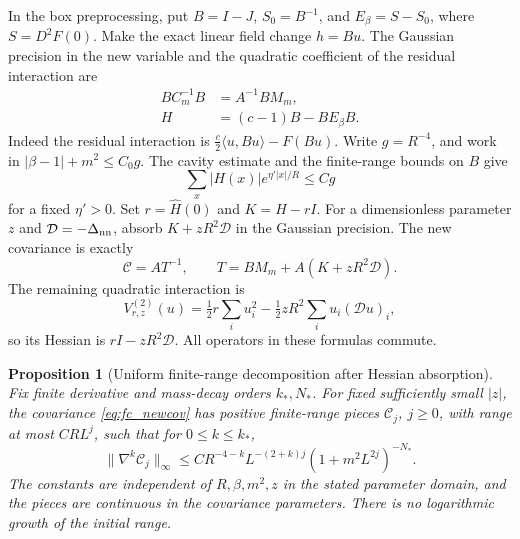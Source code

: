 \documentclass[11pt]{article}
\newtheorem{proposition}{Proposition}[section]
\begin{document}
In the box preprocessing, put \(B=I-J\), \(S_0=B^{-1}\), and
\(E_\beta=S-S_0\), where \(S=D^2F(0)\). Make the exact linear field
change \(h=Bu\). The Gaussian precision in the new variable and the
quadratic coefficient of the residual interaction are
\begin{align*}
 B C_m^{-1} B&=A^{-1}B M_m,\\
 H&=(c-1)B-BE_\beta B .
\end{align*}
Indeed the residual interaction is
\(\frac c2\langle u,Bu\rangle-F(Bu)\). Write \(g=R^{-4}\), and
work in \(|\beta-1|+m^2\le C_0g\). The cavity estimate and the
finite-range bounds on \(B\) give
\begin{equation}\label{eq:fc_Hnorm}
 \sum_x |H(x)|e^{\eta'|x|/R}\le Cg
\end{equation}
for a fixed \(\eta'>0\). Set \(r=\widehat H(0)\) and \(K=H-rI\).
For a dimensionless parameter \(z\) and \(\mathcal D=-\Delta_{\rm nn}\),
absorb \(K+zR^2\mathcal D\) in the Gaussian precision. The new covariance
is exactly
\begin{equation}\label{eq:fc_newcov}
 \mathscr C=A T^{-1},\qquad
 T=BM_m+A(K+zR^2\mathcal D).
\end{equation}
The remaining quadratic interaction is
\[
 V^{(2)}_{r,z}(u)=\tfrac12r\sum_i u_i^2
       -\tfrac12zR^2\sum_i u_i(\mathcal D u)_i,
\]
so its Hessian is \(rI-zR^2\mathcal D\). All operators in these formulas commute.

\begin{proposition}[Uniform finite-range decomposition after Hessian absorption]\label{prop:fc_newcovbound}
Fix finite derivative and mass-decay orders \(k_*,N_*\). For fixed
sufficiently small \(|z|\), the covariance \eqref{eq:fc_newcov} has
positive finite-range pieces \(\mathscr C_j\), \(j\ge0\), with range
at most \(C R L^j\), such that for \(0\le k\le k_*\),
\[
 \|\nabla^k\mathscr C_j\|_\infty
 \le C R^{-4-k}L^{-(2+k)j}(1+m^2L^{2j})^{-N_*}.
\]
The constants are independent of \(R,\beta,m^2,z\) in the stated
parameter domain, and the pieces are continuous in the covariance
parameters. There is no logarithmic growth of the initial range.
\end{proposition}
\end{document}

